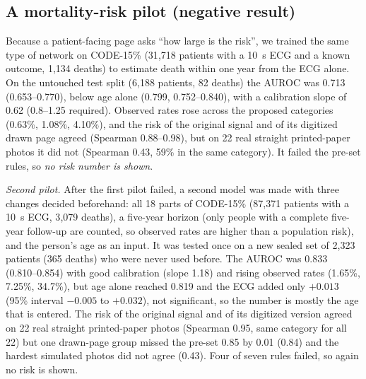 \documentclass[conference]{IEEEtran}
\begin{document}
\subsection{A mortality-risk pilot (negative result)}
Because a patient-facing page asks ``how large is the risk'', we trained the same type of network on CODE-15\% (31{,}718 patients with a 10~s ECG and a known outcome, 1{,}134 deaths) to estimate death within one year from the ECG alone. On the untouched test split (6{,}188 patients, 82 deaths) the AUROC was 0.713 (0.653--0.770), below age alone (0.799, 0.752--0.840), with a calibration slope of 0.62 (0.8--1.25 required). Observed rates rose across the proposed categories (0.63\%, 1.08\%, 4.10\%), and the risk of the original signal and of its digitized drawn page agreed (Spearman 0.88--0.98), but on 22 real straight printed-paper photos it did not (Spearman 0.43, 59\% in the same category). It failed the pre-set rules, so \emph{no risk number is shown}.

\emph{Second pilot.} After the first pilot failed, a second model was made with three changes decided beforehand: all 18 parts of CODE-15\% (87{,}371 patients with a 10~s ECG, 3{,}079 deaths), a five-year horizon (only people with a complete five-year follow-up are counted, so observed rates are higher than a population risk), and the person's age as an input. It was tested once on a new sealed set of 2{,}323 patients (365 deaths) who were never used before. The AUROC was 0.833 (0.810--0.854) with good calibration (slope 1.18) and rising observed rates (1.65\%, 7.25\%, 34.7\%), but age alone reached 0.819 and the ECG added only $+0.013$ (95\% interval $-0.005$ to $+0.032$), not significant, so the number is mostly the age that is entered. The risk of the original signal and of its digitized version agreed on 22 real straight printed-paper photos (Spearman 0.95, same category for all 22) but one drawn-page group missed the pre-set 0.85 by 0.01 (0.84) and the hardest simulated photos did not agree (0.43). Four of seven rules failed, so again no risk is shown.
\end{document}

